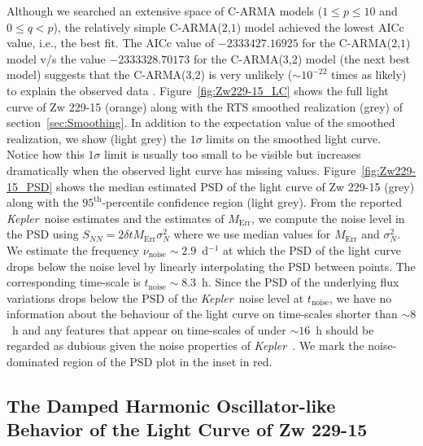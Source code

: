 \documentclass[a4paper,fleqn,usenatbib]{mnras}
\newcommand{\Kepler}{\textit{Kepler~}}
\begin{document}
Although we searched an extensive space of C-ARMA models ($1 \leq p \leq 10$ and $0 \leq q < p$), the relatively simple C-ARMA($2$,$1$) model achieved the lowest AICc value, i.e., the best fit. The AICc value of $-2333427.16925$ for the C-ARMA($2$,$1$) model v/s the value $-2333328.70173$ for the C-ARMA($3$,$2$) model (the next best model) suggests that the C-ARMA($3$,$2$) is very unlikely ($\sim 10^{-22}$ times as likely) to explain the observed data \citep{ModelSelection}. Figure~\ref{fig:Zw229-15_LC} shows the full light curve of Zw 229-15 (orange) along with the RTS smoothed realization (grey) of section~\ref{sec:Smoothing}. In addition to the expectation value of the smoothed realization, we show (light grey) the $1\sigma$ limits on the smoothed light curve. Notice how this $1\sigma$ limit is usually too small to be visible but increases dramatically when the observed light curve has missing values. Figure~\ref{fig:Zw229-15_PSD} shows the median estimated PSD of the light curve of Zw 229-15 (grey) along with the $95^{\mathrm{th}}$-percentile confidence region (light grey). From the reported \Kepler noise estimates and the estimates of $M_{\mathrm{Err}}$, we compute the noise level in the PSD using $S_{NN} = 2\delta t M_{\mathrm{Err}} \sigma^{2}_{N}$ where we use median values for $M_{\mathrm{Err}}$ and $\sigma^{2}_{N}$. We estimate the frequency $\nu_{\mathrm{noise}} \sim 2.9$~d$^{-1}$ at which the PSD of the light curve drops below the noise level by linearly interpolating the PSD between points. The corresponding time-scale is $t_{\mathrm{noise}} \sim 8.3$~h. Since the PSD of the underlying flux variations drops below the PSD of the \Kepler noise level at $t_{\mathrm{noise}}$, we have no information about the behaviour of the light curve on time-scales shorter than $\sim 8$~h and any features that appear on time-scales of under $\sim 16$~h should be regarded as dubious given the noise properties of \Kepler. We mark the noise-dominated region of the PSD plot in the inset in red. 

\subsection[dHO Behavior of Zw 229-15]{The Damped Harmonic Oscillator-like Behavior of the Light Curve of Zw 229-15}\label{sec:DHO}
\end{document}
